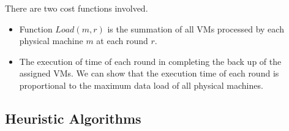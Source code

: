 
There are two cost functions involved.
\begin{itemize}
\item Function $Load(m, r)$  is
the summation of all VMs  processed by each physical machine $m$ at each round $r$.
\item The execution of time of each round in completing the back up of the assigned VMs.
We can show that the execution time of each round is proportional to the maximum
data load of all physical machines.
\end{itemize}


\subsection{Heuristic Algorithms}

